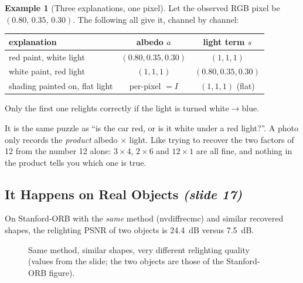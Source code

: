 \documentclass[11pt,a4paper]{article}
\newcommand{\slideone}[1]{\texorpdfstring{\emph{(slide #1)}}{(slide #1)}}
\theoremstyle{definition}
\newtheorem{example}[definition]{Example}
\theoremstyle{plain}
\theoremstyle{remark}
\begin{document}
\begin{example}[Three explanations, one pixel]
Let the observed RGB pixel be $(0.80,\,0.35,\,0.30)$. The following all give it, channel by channel:
\begin{center}
\begin{tabular}{lcc}
\toprule
explanation & albedo $a$ & light term $s$\\
\midrule
red paint, white light & $(0.80,0.35,0.30)$ & $(1,1,1)$\\
white paint, red light & $(1,1,1)$ & $(0.80,0.35,0.30)$\\
shading painted on, flat light & per-pixel $=I$ & $(1,1,1)$ (flat)\\
\bottomrule
\end{tabular}
\end{center}
Only the first one relights correctly if the light is turned white$\to$blue.
\end{example}

\begin{intuition}
It is the same puzzle as ``is the car red, or is it white under a red light?''. A photo only records the \emph{product} albedo $\times$ light. Like trying to recover the two factors of 12 from the number 12 alone: $3\times4$, $2\times6$ and $12\times1$ are all fine, and nothing in the product tells you which one is true.
\end{intuition}

\subsection{It Happens on Real Objects \slideone{17}}

On Stanford-ORB with the \emph{same} method (nvdiffrecmc) and similar recovered shapes, the relighting PSNR of two objects is 24.4~dB versus 7.5~dB.

\begin{figure}[!htbp]\centering
{}
\caption{Same method, similar shapes, very different relighting quality (values from the slide; the two objects are those of the Stanford-ORB figure).}
\end{figure}
\end{document}
